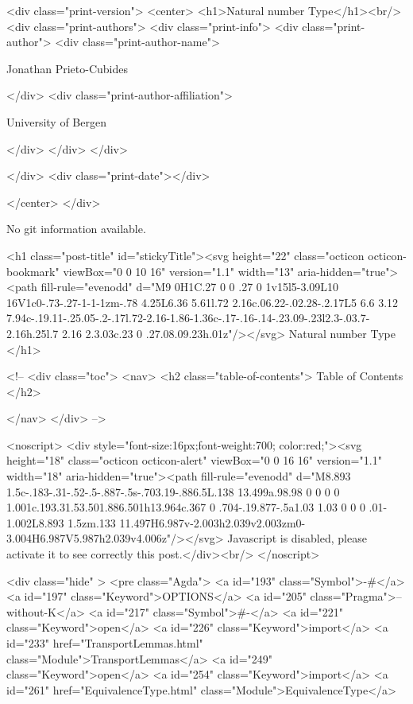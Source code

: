   <div class="print-version">
    <center>
      <h1>Natural number Type</h1><br/>
        <div class="print-authors">
          <div class="print-info">
            <div class="print-author">
              <div class="print-author-name">
                
                  Jonathan Prieto-Cubides
                
              </div>
              <div class="print-author-affiliation">
                
                  University of Bergen
                
                </div>
            </div>
          </div>
          
          
        </div>
        <div class="print-date"></div>
        
        
    </center>
  </div>

  
  No git information available.
  
  <h1 class="post-title" id="stickyTitle"><svg height="22" class="octicon octicon-bookmark" viewBox="0 0 10 16" version="1.1" width="13" aria-hidden="true"><path fill-rule="evenodd" d="M9 0H1C.27 0 0 .27 0 1v15l5-3.09L10 16V1c0-.73-.27-1-1-1zm-.78 4.25L6.36 5.61l.72 2.16c.06.22-.02.28-.2.17L5 6.6 3.12 7.94c-.19.11-.25.05-.2-.17l.72-2.16-1.86-1.36c-.17-.16-.14-.23.09-.23l2.3-.03.7-2.16h.25l.7 2.16 2.3.03c.23 0 .27.08.09.23h.01z"/></svg> Natural number Type
  </h1>

  <!-- 
  <div class="toc">
    <nav>
    <h2 class="table-of-contents"> Table of Contents </h2>
      

    </nav>
  </div>
   -->

  <noscript>
  <div style="font-size:16px;font-weight:700; color:red;"><svg height="18" class="octicon octicon-alert" viewBox="0 0 16 16" version="1.1" width="18" aria-hidden="true"><path fill-rule="evenodd" d="M8.893 1.5c-.183-.31-.52-.5-.887-.5s-.703.19-.886.5L.138 13.499a.98.98 0 0 0 0 1.001c.193.31.53.501.886.501h13.964c.367 0 .704-.19.877-.5a1.03 1.03 0 0 0 .01-1.002L8.893 1.5zm.133 11.497H6.987v-2.003h2.039v2.003zm0-3.004H6.987V5.987h2.039v4.006z"/></svg> Javascript is disabled, please activate it to see correctly this post.</div><br/>
  </noscript>

  <div class="hide" >
<pre class="Agda">
<a id="193" class="Symbol">{-#</a> <a id="197" class="Keyword">OPTIONS</a> <a id="205" class="Pragma">--without-K</a> <a id="217" class="Symbol">#-}</a>
<a id="221" class="Keyword">open</a> <a id="226" class="Keyword">import</a> <a id="233" href="TransportLemmas.html" class="Module">TransportLemmas</a>
<a id="249" class="Keyword">open</a> <a id="254" class="Keyword">import</a> <a id="261" href="EquivalenceType.html" class="Module">EquivalenceType</a>


